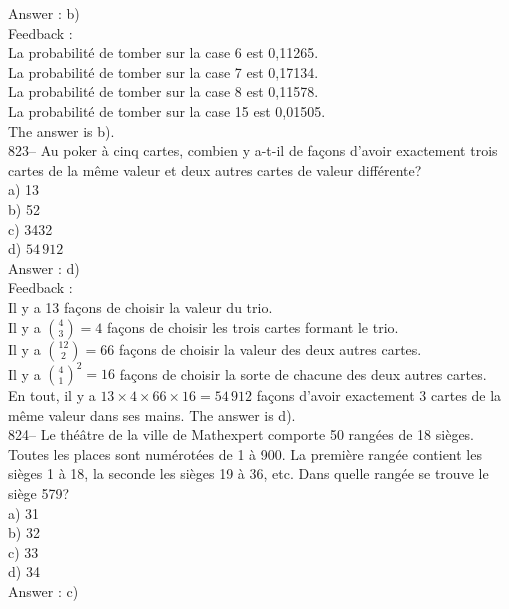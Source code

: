 ﻿\documentclass[letterpaper, 12pt]{article}
\begin{document}
Answer : b)\\

Feedback : \\
La probabilit\'e de tomber sur la case 6 est 0,11265.\\
La probabilit\'e de tomber sur la case 7 est 0,17134.\\
La probabilit\'e de tomber sur la case 8 est 0,11578.\\
La probabilit\'e de tomber sur la case 15 est 0,01505.\\
The answer is b).\\

823-- Au poker \`a cinq cartes, combien y a-t-il de fa\c cons d'avoir
exactement trois cartes de la m\^eme valeur et deux autres cartes de valeur
diff\'erente?\\
a) 13\\
b) 52\\
c) 3432\\
d) $54\,912$\\

Answer : d)\\

Feedback : \\
Il y a 13 fa\c cons de choisir la valeur du trio.\\ [2mm] Il y a
$\binom{4}{3}=4$ fa\c cons de choisir les trois cartes formant le
trio.\\ [2mm] Il y a $\binom{12}{2}=66$ fa\c cons de choisir la
valeur des deux autres cartes.\\ [2mm] Il y a $\binom{4}{1}^{2}=16$
fa\c cons de choisir la sorte de chacune des deux autres cartes.\\
[2mm]
En tout, il y a $13\times4\times66\times16=54\,912$ fa\c cons d'avoir
exactement 3 cartes de la m\^eme valeur dans ses mains.  The answer is
d).\\

824-- Le th\'e\^atre de la ville de Mathexpert comporte 50 rang\'ees de 18
si\`eges.  Toutes  les places sont num\'erot\'ees de 1 \`a 900.  La
premi\`ere rang\'ee contient les si\`eges 1 \`a 18, la seconde les si\`eges
19 \`a 36, etc.  Dans quelle rang\'ee se trouve le si\`ege 579?\\
a) 31\\
b) 32\\
c) 33\\
d) 34\\

Answer : c) \\
\end{document}
